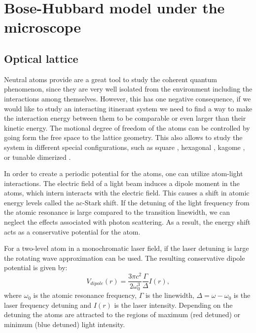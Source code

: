 
\chapter{Bose-Hubbard model under the microscope}

\section{Optical lattice}
Neutral atoms provide are a great tool to study the coherent quantum phenomenon, since they are very well isolated from the environment including the interactions among themselves. However, this has one negative consequence, if we would like to study an interacting itinerant system we need to find a way to make the interaction energy between them to be comparable or even larger than their kinetic energy. The motional degree of freedom of the atoms can be controlled by going form the free space to the lattice geometry. This also allows to study the system in different special configurations, such as square \cite{Greiner2002}, hexagonal \cite{New J. Phys., 12:065025, 2010}, kagome \cite{Phys. Rev. Lett., 108:045305, 2012}, or tunable dimerized \cite{Science, 340:1307, 2013}.

In order to create a periodic potential for the atoms, one can utilize atom-light interactions. The electric field of a light beam induces a dipole moment in the atoms, which intern interacts with the electric field. This causes a shift in atomic energy levels called the ac-Stark shift. If the detuning of the light frequency from the atomic resonance is large compared to the transition linewidth, we can neglect the effects associated with photon scattering. As a result, the energy shift acts as a conservative potential for the atom.

For a two-level atom in a monochromatic laser field, if the laser detuning is large the rotating wave approximation can be used. The resulting conservative dipole potential is given by:
\begin{equation}
V_{dipole}(r) = \frac{3\pi c^2}{2\omega_0^3} \frac{\Gamma}{\Delta} I(r),
\end{equation}
where $\omega_0$ is the atomic resonance frequency, $\Gamma$ is the linewidth, $\Delta = \omega-\omega_0$ is the laser frequency detuning and $I(r)$ is the laser intensity. Depending on the detuning the atoms are attracted to the regions of maximum (red detuned) or minimum (blue detuned) light intensity. 

